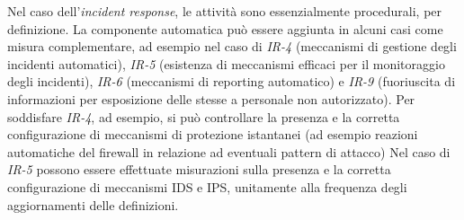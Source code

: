 Nel caso dell'\textit{incident response}, le attività sono essenzialmente procedurali, per definizione.
La componente automatica può essere aggiunta in alcuni casi come misura complementare, ad esempio nel caso di \textit{IR-4} (meccanismi di gestione degli incidenti automatici), \textit{IR-5} (esistenza di meccanismi efficaci per il monitoraggio degli incidenti), \textit{IR-6} (meccanismi di reporting automatico) e \textit{IR-9} (fuoriuscita di informazioni per esposizione delle stesse a personale non autorizzato). 
Per soddisfare \textit{IR-4}, ad esempio, si può controllare la presenza e la corretta configurazione di meccanismi di protezione istantanei (ad esempio reazioni automatiche del firewall in relazione ad eventuali pattern di attacco)
Nel caso di \textit{IR-5} possono essere effettuate misurazioni sulla presenza e la corretta configurazione di meccanismi IDS e IPS, unitamente alla frequenza degli aggiornamenti delle definizioni.
\vfill
\newpage
